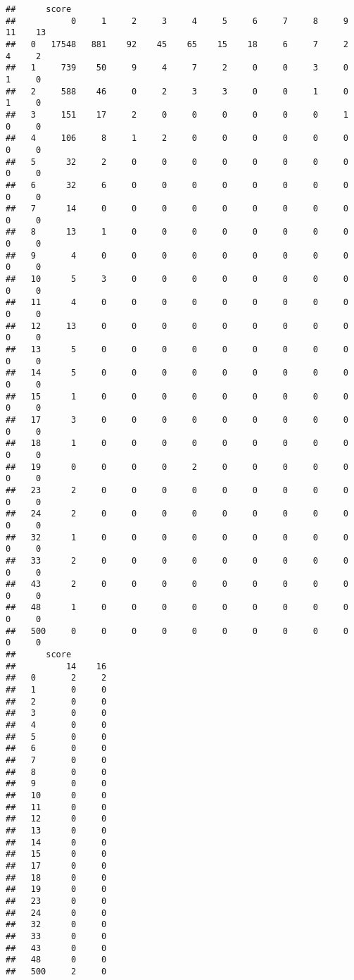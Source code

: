 \documentclass[
]{article}
\begin{document}
\begin{verbatim}
##      score
##           0     1     2     3     4     5     6     7     8     9    11    13
##   0   17548   881    92    45    65    15    18     6     7     2     4     2
##   1     739    50     9     4     7     2     0     0     3     0     1     0
##   2     588    46     0     2     3     3     0     0     1     0     1     0
##   3     151    17     2     0     0     0     0     0     0     1     0     0
##   4     106     8     1     2     0     0     0     0     0     0     0     0
##   5      32     2     0     0     0     0     0     0     0     0     0     0
##   6      32     6     0     0     0     0     0     0     0     0     0     0
##   7      14     0     0     0     0     0     0     0     0     0     0     0
##   8      13     1     0     0     0     0     0     0     0     0     0     0
##   9       4     0     0     0     0     0     0     0     0     0     0     0
##   10      5     3     0     0     0     0     0     0     0     0     0     0
##   11      4     0     0     0     0     0     0     0     0     0     0     0
##   12     13     0     0     0     0     0     0     0     0     0     0     0
##   13      5     0     0     0     0     0     0     0     0     0     0     0
##   14      5     0     0     0     0     0     0     0     0     0     0     0
##   15      1     0     0     0     0     0     0     0     0     0     0     0
##   17      3     0     0     0     0     0     0     0     0     0     0     0
##   18      1     0     0     0     0     0     0     0     0     0     0     0
##   19      0     0     0     0     2     0     0     0     0     0     0     0
##   23      2     0     0     0     0     0     0     0     0     0     0     0
##   24      2     0     0     0     0     0     0     0     0     0     0     0
##   32      1     0     0     0     0     0     0     0     0     0     0     0
##   33      2     0     0     0     0     0     0     0     0     0     0     0
##   43      2     0     0     0     0     0     0     0     0     0     0     0
##   48      1     0     0     0     0     0     0     0     0     0     0     0
##   500     0     0     0     0     0     0     0     0     0     0     0     0
##      score
##          14    16
##   0       2     2
##   1       0     0
##   2       0     0
##   3       0     0
##   4       0     0
##   5       0     0
##   6       0     0
##   7       0     0
##   8       0     0
##   9       0     0
##   10      0     0
##   11      0     0
##   12      0     0
##   13      0     0
##   14      0     0
##   15      0     0
##   17      0     0
##   18      0     0
##   19      0     0
##   23      0     0
##   24      0     0
##   32      0     0
##   33      0     0
##   43      0     0
##   48      0     0
##   500     2     0
\end{verbatim}
\end{document}

